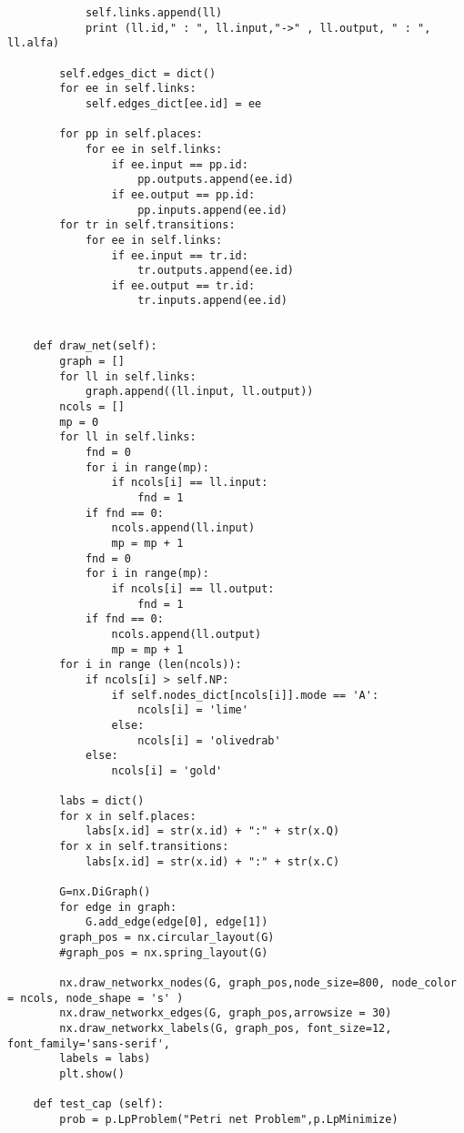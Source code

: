 \documentclass[12pt,a4paper]{book}
\begin{document}
\begin{verbatim}
            self.links.append(ll)
            print (ll.id," : ", ll.input,"->" , ll.output, " : ", ll.alfa)
        
        self.edges_dict = dict()
        for ee in self.links:
            self.edges_dict[ee.id] = ee
        
        for pp in self.places:
            for ee in self.links:
                if ee.input == pp.id:
                    pp.outputs.append(ee.id)
                if ee.output == pp.id:
                    pp.inputs.append(ee.id)
        for tr in self.transitions:
            for ee in self.links:
                if ee.input == tr.id:
                    tr.outputs.append(ee.id)
                if ee.output == tr.id:
                    tr.inputs.append(ee.id)
    
    
    def draw_net(self):
        graph = []
        for ll in self.links:
            graph.append((ll.input, ll.output))
        ncols = []
        mp = 0
        for ll in self.links:
            fnd = 0
            for i in range(mp):
                if ncols[i] == ll.input:
                    fnd = 1
            if fnd == 0:
                ncols.append(ll.input)
                mp = mp + 1
            fnd = 0
            for i in range(mp):
                if ncols[i] == ll.output:
                    fnd = 1
            if fnd == 0:
                ncols.append(ll.output)
                mp = mp + 1
        for i in range (len(ncols)):
            if ncols[i] > self.NP:
                if self.nodes_dict[ncols[i]].mode == 'A':
                    ncols[i] = 'lime'
                else:
                    ncols[i] = 'olivedrab'
            else:
                ncols[i] = 'gold'
            
        labs = dict()
        for x in self.places:
            labs[x.id] = str(x.id) + ":" + str(x.Q)
        for x in self.transitions:
            labs[x.id] = str(x.id) + ":" + str(x.C)

        G=nx.DiGraph()
        for edge in graph:
            G.add_edge(edge[0], edge[1])
        graph_pos = nx.circular_layout(G)
        #graph_pos = nx.spring_layout(G)
    
        nx.draw_networkx_nodes(G, graph_pos,node_size=800, node_color = ncols, node_shape = 's' )
        nx.draw_networkx_edges(G, graph_pos,arrowsize = 30)
        nx.draw_networkx_labels(G, graph_pos, font_size=12, font_family='sans-serif',
        labels = labs)
        plt.show()

    def test_cap (self):
        prob = p.LpProblem("Petri net Problem",p.LpMinimize)


\end{verbatim}
\end{document}
